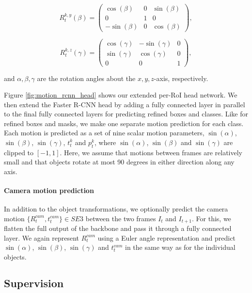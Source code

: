 \begin{equation}
R_t^{k,y}(\beta) =
\begin{pmatrix}
  \cos(\beta) & 0 & \sin(\beta) \\
  0 & 1 & 0 \\
  -\sin(\beta) & 0 & \cos(\beta)
\end{pmatrix},
\end{equation}

\begin{equation}
R_t^{k,z}(\gamma) =
\begin{pmatrix}
  \cos(\gamma) & -\sin(\gamma) & 0 \\
  \sin(\gamma) & \cos(\gamma) & 0 \\
  0 & 0 & 1
\end{pmatrix},
\end{equation}

and $\alpha, \beta, \gamma$ are the rotation angles about the $x,y,z$-axis, respectively.


Figure \ref{fig:motion_rcnn_head} shows our extended per-RoI head network.
We then extend the Faster R-CNN head by adding a fully connected layer in parallel to the final fully connected layers for
predicting refined boxes and classes.
Like for refined boxes and masks, we make one separate motion prediction for each class.
Each motion is predicted as a set of nine scalar motion parameters,
$\sin(\alpha)$, $\sin(\beta)$, $\sin(\gamma)$, $t_t^k$ and $p_t^k$,
where $\sin(\alpha)$, $\sin(\beta)$ and $\sin(\gamma)$ are clipped to $[-1, 1]$.
Here, we assume that motions between frames are relatively small
and that objects rotate at most 90 degrees in either direction along any axis.

\paragraph{Camera motion prediction}
In addition to the object transformations, we optionally predict the camera motion $\{R_t^{cam}, t_t^{cam}\}\in SE3$
between the two frames $I_t$ and $I_{t+1}$.
For this, we flatten the full output of the backbone and pass it through a fully connected layer.
We again represent $R_t^{cam}$ using a Euler angle representation and
predict $\sin(\alpha)$, $\sin(\beta)$, $\sin(\gamma)$ and $t_t^{cam}$ in the same way as for the individual objects.

\subsection{Supervision}

